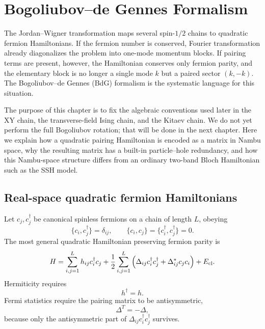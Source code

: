 \chapter{Bogoliubov--de Gennes Formalism}

The Jordan--Wigner transformation maps several spin-$1/2$ chains to quadratic
fermion Hamiltonians.  If the fermion number is conserved, Fourier
transformation already diagonalizes the problem into one-mode momentum blocks. If
pairing terms are present, however, the Hamiltonian conserves only fermion
parity, and the elementary block is no longer a single mode $k$ but a paired
sector $(k,-k)$.  The Bogoliubov--de Gennes (BdG) formalism is the systematic
language for this situation.

The purpose of this chapter is to fix the algebraic conventions used later in
the XY chain, the transverse-field Ising chain, and the Kitaev chain.  We do not
yet perform the full Bogoliubov rotation; that will be done in the next chapter.
Here we explain how a quadratic pairing Hamiltonian is encoded as a matrix in
Nambu space, why the resulting matrix has a built-in particle--hole redundancy,
and how this Nambu-space structure differs from an ordinary two-band Bloch
Hamiltonian such as the SSH model.

\section{Real-space quadratic fermion Hamiltonians}

Let $c_j,c_j^\dagger$ be canonical spinless fermions on a chain of length $L$,
obeying
\begin{equation}
    \{c_i,c_j^\dagger\}=\delta_{ij},
    \qquad
    \{c_i,c_j\}=\{c_i^\dagger,c_j^\dagger\}=0.
\end{equation}
The most general quadratic Hamiltonian preserving fermion parity is
\begin{equation}
\label{eq:bdg-real-space-quadratic-hamiltonian}
    H
    =
    \sum_{i,j=1}^{L} h_{ij}c_i^\dagger c_j
    +\frac12\sum_{i,j=1}^{L}
    \left(
        \Delta_{ij}c_i^\dagger c_j^\dagger
        +\Delta_{ij}^*c_j c_i
    \right)
    +E_{\rm cl}.
\end{equation}
Hermiticity requires
\begin{equation}
    h^\dagger=h.
\end{equation}
Fermi statistics require the pairing matrix to be antisymmetric,
\begin{equation}
\label{eq:bdg-pairing-antisymmetry-real-space}
    \Delta^T=-\Delta,
\end{equation}
because only the antisymmetric part of $\Delta_{ij}c_i^\dagger c_j^\dagger$
survives.

